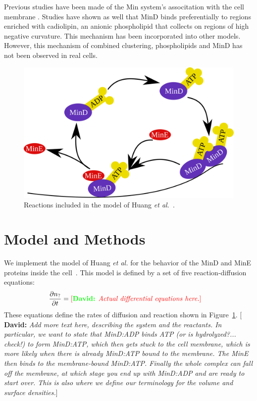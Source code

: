 \documentclass[letterpaper,twocolumn,amsmath,amssymb,pre]{revtex4-1}
\newcommand{\green}[1]{{\bf \color{green} #1}}
\newcommand{\davidsays}[1]{{\color{red} [\green{David:} \emph{#1}]}}
\begin{document}
Previous studies have been made of the Min system's associtation with
the cell membrane
\cite{hsieh2010direct}\cite{mileykovskaya2003effects}.  Studies have
shown as well that MinD binds preferentially to regions enriched with
cadiolipin, an anionic phospholipid that collects on regions of high
negative curvature. This mechanism has been incorporated into other
models.\cite{drew2005polymerization,cytrynbaum2007multistranded,renner2012mind,renner2012mind}
However, this mechanism of combined clustering, phospholipids and MinD
has not been observed in real cells. \cite{halatek2012highly}

\begin{figure}
  \includegraphics[width=\columnwidth]{reactions}
  \caption{Reactions included in the model of Huang \emph{et
      al.}~\cite{huang2003dynamic}.}\label{fig:reactions}
\end{figure}

\section{Model and Methods}
We implement the model of Huang \emph{et al.}  for the behavior of the
MinD and MinE proteins inside the cell~\cite{huang2003dynamic}.  This
model is defined by a set of five reaction-diffusion equations:
\begin{align}
  \frac{\partial n_{?}}{\partial t} &= \text{\davidsays{Actual differential equations here.}}
\end{align}
These equations define the rates of diffusion and reaction shown in
Figure~\ref{fig:reactions}.  \davidsays{Add more text here, describing
  the system and the reactants.  In particular, we want to state that
  MinD:ADP binds ATP (or is hydrolyzed?... check!) to form MinD:ATP,
  which then gets stuck to the cell membrane, which is more likely
  when there is already MinD:ATP bound to the membrane.  The MinE then
  binds to the membrane-bound MinD:ATP.  Finally the whole complex can
  fall off the membrane, at which stage you end up with MinD:ADP and
  are ready to start over.  This is also where we define our
  terminology for the volume and surface densities.}
\end{document}
